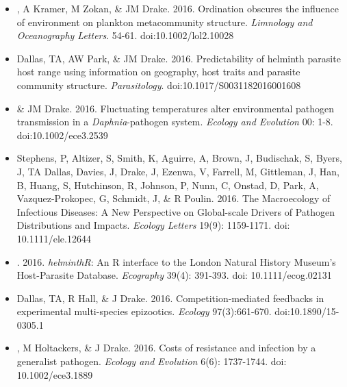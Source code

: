 \documentclass[]{CV}
\begin{document}
{}
\begin{itemize}

\item {}, A Kramer, M Zokan, \& JM Drake. 2016. Ordination obscures the influence of environment on plankton metacommunity structure. \textit{Limnology and Oceanography Letters}. 54-61. doi:10.1002/lol2.10028

\item {\mefont Dallas, TA}, AW Park, \& JM Drake. 2016. Predictability of helminth parasite host range using information on geography, host traits and parasite community structure. \textit{Parasitology}. doi:10.1017/S0031182016001608

\item {} \& JM Drake. 2016. Fluctuating temperatures alter environmental pathogen transmission in a \textit{Daphnia}-pathogen system. \textit{Ecology and Evolution} 00: 1-8. doi:10.1002/ece3.2539

\item \OA Stephens, P, Altizer, S, Smith, K, Aguirre, A, Brown, J, Budischak, S, Byers, J, {\mefont TA Dallas}, Davies, J, Drake, J, Ezenwa, V, Farrell, M, Gittleman, J, Han, B, Huang, S, Hutchinson, R, Johnson, P, Nunn, C, Onstad, D, Park, A, Vazquez-Prokopec, G, Schmidt, J, \& R Poulin. 2016. The Macroecology of Infectious Diseases: A New Perspective on Global-scale Drivers of Pathogen Distributions and Impacts. \textit{Ecology Letters} 19(9): 1159-1171. doi: 10.1111/ele.12644

\item {}. 2016. \textit{helminthR}: An R interface to the London Natural History Museum's Host-Parasite Database. \textit{Ecography} 39(4): 391-393. doi: 10.1111/ecog.02131 

\item {\mefont Dallas, TA}, R Hall, \& J Drake. 2016. Competition-mediated feedbacks in experimental multi-species epizootics. \textit{Ecology} 97(3):661-670. doi:10.1890/15-0305.1 

\item {}, M Holtackers, \& J Drake. 2016. Costs of resistance and infection by a generalist pathogen. \textit{Ecology and Evolution} 6(6): 1737-1744. doi: 10.1002/ece3.1889 

\end{itemize}



{}
\end{document}
